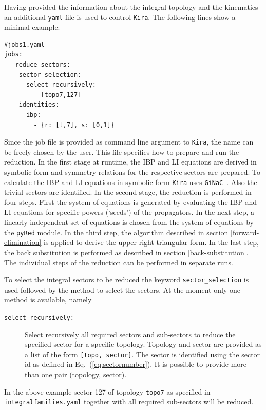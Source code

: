 \documentclass[a4paper,12pt]{scrartcl}
\newcommand*{\kira}{\texttt{Kira}}
\newcommand*{\pyred}{\texttt{pyRed}}
\newcommand*{\ginac}{\texttt{GiNaC}}
\newcommand*{\yaml}{\texttt{yaml}}
\def\Eq#1{{Eq.~(\ref{#1})}}
\begin{document}
Having provided the information about the integral topology and the
kinematics an additional \yaml{} file is used to control \kira{}. The
following lines show a minimal example:
\begin{verbatim}
#jobs1.yaml
jobs:
 - reduce_sectors:
    sector_selection:
      select_recursively:
        - [topo7,127]
    identities:
      ibp:
        - {r: [t,7], s: [0,1]}
\end{verbatim}
Since the job file is provided as command line argument to \kira{}, the name can
be freely chosen by the user. This file specifies how to prepare
and run the reduction. In the first stage at runtime, the IBP and LI equations are derived in
symbolic form and symmetry relations for the respective sectors are
prepared. To calculate the IBP and LI equations in symbolic form \kira{} uses
\ginac{}~\cite{Bauer:2000cp,Vollinga:2005pk}. Also the trivial sectors are identified.
In the second stage, the reduction is performed in four steps.
First the system of equations is generated by
evaluating the IBP and LI equations for specific powers (`seeds') of
the propagators.
In the next step, a linearly independent set of equations is chosen from the
system of equations by the \pyred{} module. In the third step, the algorithm
described in section \ref{forward-elimination} is applied
to derive the upper-right triangular form. In
the last step, the back substitution is performed as described in
section \ref{back-substitution}.
The individual steps of the reduction can be performed in separate runs.

To select the integral sectors to be reduced
the keyword \texttt{sector\_selection} is used followed by the
method to select the sectors. At the moment only
one method is available, namely
\begin{description}
\item[\texttt{select\_recursively:}] Select recursively all required
  sectors and sub-sectors to reduce the specified sector for a specific
  topology. Topology and sector are provided as a list of the form
  \texttt{[topo, sector]}.  The sector is identified using the sector
  id as defined in \Eq{eq:sectornumber}.
  It is possible to provide more than one pair (topology, sector).
\end{description}
In the above example sector 127 of topology \texttt{topo7} as
specified in \texttt{integralfamilies.yaml} together with all required
sub-sectors will be reduced.
\end{document}
